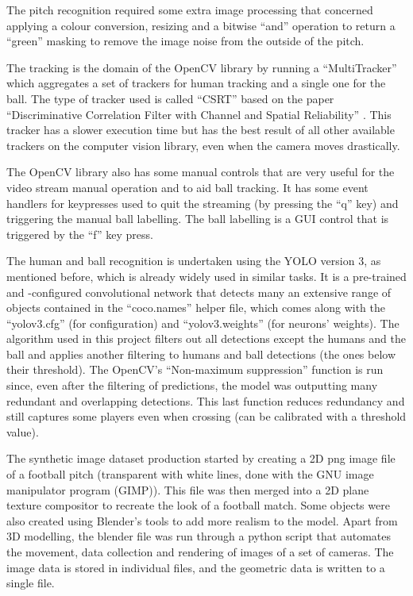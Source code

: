 \documentclass[
    11pt,
    oneside
]{report}
\begin{document}
The pitch recognition required some extra image processing that concerned applying a colour conversion, resizing and a bitwise ``and'' operation to return a ``green'' masking to remove the image noise from the outside of the pitch.


The tracking is the domain of the OpenCV \cite{opencv} library by running a ``MultiTracker'' which aggregates a set of trackers for human tracking and a single one for the ball. The type of tracker used is called ``CSRT'' based on the paper ``Discriminative Correlation Filter with Channel and Spatial Reliability'' \cite{csrt}. This tracker has a slower execution time but has the best result of all other available trackers on the computer vision library, even when the camera moves drastically.


The OpenCV \cite{opencv} library also has some manual controls that are very useful for the video stream manual operation and to aid ball tracking. It has some event handlers for keypresses used to quit the streaming (by pressing the ``q'' key) and triggering the manual ball labelling. The ball labelling is a GUI control that is triggered by the ``f'' key press.


The human and ball recognition is undertaken using the YOLO \cite{yolo} version 3, as mentioned before, which is already widely used in similar tasks. It is a pre-trained and -configured convolutional network that detects many an extensive range of objects contained in the ``coco.names'' helper file, which comes along with the ``yolov3.cfg'' (for configuration) and ``yolov3.weights'' (for neurons' weights). The algorithm used in this project filters out all detections except the humans and the ball and applies another filtering to humans and ball detections (the ones below their threshold). The OpenCV's \cite{opencv} ``Non-maximum suppression'' \cite{nms} function is run since, even after the filtering of predictions, the model was outputting many redundant and overlapping detections. This last function reduces redundancy and still captures some players even when crossing (can be calibrated with a threshold value).


The synthetic image dataset production started by creating a 2D png image file of a football pitch (transparent with white lines, done with the GNU image manipulator program (GIMP)). This file was then merged into a 2D plane texture compositor to recreate the look of a football match. Some objects were also created using Blender's tools to add more realism to the model. Apart from 3D modelling, the blender file was run through a python script that automates the movement, data collection and rendering of images of a set of cameras. The image data is stored in individual files, and the geometric data is written to a single file.
\end{document}
